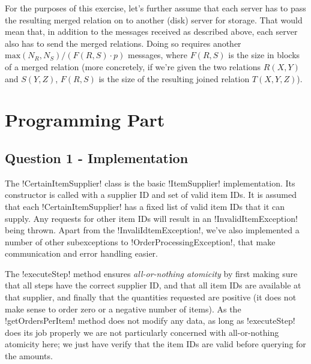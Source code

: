 \documentclass[a4paper, 12pt]{article}
\begin{document}
For the purposes of this exercise, let's further assume that each
server has to pass the resulting merged relation on to another (disk)
server for storage. That would mean that, in addition to the messages
received as described above, each server also has to send the merged
relations. Doing so requires another $\textrm{max}(N_R, N_S) / (F(R,
S) \cdot p)$ messages, where $F(R,S)$ is the size in blocks of a
merged relation (more concretely, if we're given the two relations
$R(X,Y)$ and $S(Y,Z)$, $F(R,S)$ is the size of the resulting joined
relation $T(X,Y,Z)$).

\section*{Programming Part}

\subsection*{Question 1 - Implementation}




The !CertainItemSupplier! class is the basic !ItemSupplier!
implementation. Its constructor is called with a supplier ID and set
of valid item IDs. It is assumed that each !CertainItemSupplier! has a
fixed list of valid item IDs that it can supply. Any requests for
other item IDs will result in an !InvalidItemException! being
thrown. Apart from the !InvaliIdtemException!, we've also implemented
a number of other subexceptions to !OrderProcessingException!, that
make communication and error handling easier.

The !executeStep! method ensures \emph{all-or-nothing atomicity} by
first making sure that all steps have the correct supplier ID, and
that all item IDs are available at that supplier, and finally that the
quantities requested are positive (it does not make sense to order
zero or a negative number of items). As the !getOrdersPerItem! method
does not modify any data, as long as !executeStep! does its job
properly we are not particularly concerned with all-or-nothing
atomicity here; we just have verify that the item IDs are valid before
querying for the amounts.
\end{document}
